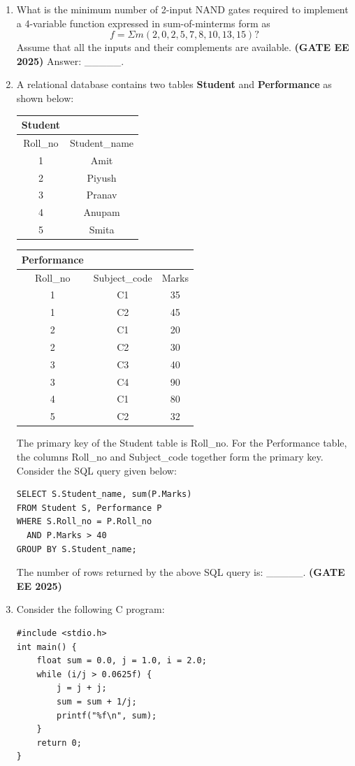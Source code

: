 \documentclass[journal,12pt,onecolumn]{IEEEtran}
\theoremstyle{remark}
\begin{document}
\begin{enumerate}
\item What is the minimum number of 2-input NAND gates required to implement a 4-variable function expressed in sum-of-minterms form as 
\[
f = \Sigma m(2,0,2,5,7,8,10,13,15)?
\]  
Assume that all the inputs and their complements are available. \hfill \textbf{(GATE EE 2025)}  
Answer: \_\_\_\_\_.



\item  A relational database contains two tables \textbf{Student} and \textbf{Performance} as shown below:



\begin{tabular}{|c|c|}
\hline
\textbf{Student} & \\
\hline
Roll\_no & Student\_name \\
\hline
1 & Amit \\
2 & Piyush \\
3 & Pranav \\
4 & Anupam \\
5 & Smita \\
\hline
\end{tabular}
\hspace{2cm}
\begin{tabular}{|c|c|c|}
\hline
\textbf{Performance} & & \\
\hline
Roll\_no & Subject\_code & Marks \\
\hline
1 & C1 & 35 \\
1 & C2 & 45 \\
2 & C1 & 20 \\
2 & C2 & 30 \\
3 & C3 & 40 \\
3 & C4 & 90 \\
4 & C1 & 80 \\
5 & C2 & 32 \\
\hline
\end{tabular}


The primary key of the Student table is Roll\_no. For the Performance table, the columns Roll\_no and Subject\_code together form the primary key.  
Consider the SQL query given below:

\begin{verbatim}
SELECT S.Student_name, sum(P.Marks)
FROM Student S, Performance P
WHERE S.Roll_no = P.Roll_no
  AND P.Marks > 40
GROUP BY S.Student_name;
\end{verbatim}

The number of rows returned by the above SQL query is: \_\_\_\_\_.
\hfill \textbf{(GATE EE 2025)}
\item  Consider the following C program:
\begin{verbatim}
#include <stdio.h>
int main() {
    float sum = 0.0, j = 1.0, i = 2.0;
    while (i/j > 0.0625f) {
        j = j + j;
        sum = sum + 1/j;
        printf("%f\n", sum);
    }
    return 0;
}
\end{verbatim}


\end{enumerate}
\end{document}
